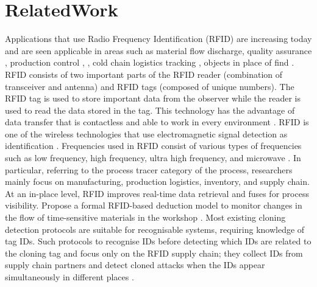 \section{RelatedWork}
\label{Related Work}
Applications that use Radio Frequency Identification (RFID) are increasing today and are seen applicable in areas such as material flow discharge, quality assurance \cite{marcus2017system}, production control \cite{ramadan2017rfid}, \cite{tao2017advanced}, cold chain logistics tracking \cite{chen2014novel}, objects in place of find \cite{cai2014boundary}. RFID consists of two important parts of the RFID reader (combination of transceiver and antenna) and RFID tags (composed of unique numbers). The RFID tag is used to store important data from the observer while the reader is used to read the data stored in the tag. This technology has the advantage of data transfer that is contactless and able to work in every environment \cite{wang2017deep}. RFID is one of the wireless technologies that use electromagnetic signal detection as identification \cite{abas2017attendance}. Frequencies used in RFID consist of various types of frequencies such as low frequency, high frequency, ultra high frequency, and microwave \cite{srinidhi2015web}. In particular, referring to the process tracer category of the process, researchers mainly focus on manufacturing, production logistics, inventory, and supply chain. At an in-place level, RFID improves real-time data retrieval and fuses for process visibility. Propose a formal RFID-based deduction model to monitor changes in the flow of time-sensitive materials in the workshop \cite{cao2017real}. Most existing cloning detection protocols are suitable for recognisable systems, requiring knowledge of tag IDs. Such protocols to recognise IDs before detecting which IDs are related to the cloning tag and focus only on the RFID supply chain; they collect IDs from supply chain partners and detect cloned attacks when the IDs appear simultaneously in different places \cite{kang2013development}.\par

